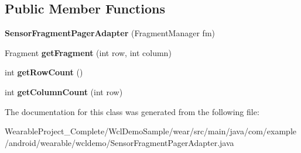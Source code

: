 \subsection*{Public Member Functions}
\begin{DoxyCompactItemize}
\item 
{\bfseries Sensor\+Fragment\+Pager\+Adapter} (Fragment\+Manager fm)\hypertarget{classcom_1_1example_1_1android_1_1wearable_1_1wcldemo_1_1SensorFragmentPagerAdapter_aa6cb1da97e551772bb3b2a8d407ede9e}{}\label{classcom_1_1example_1_1android_1_1wearable_1_1wcldemo_1_1SensorFragmentPagerAdapter_aa6cb1da97e551772bb3b2a8d407ede9e}

\item 
Fragment {\bfseries get\+Fragment} (int row, int column)\hypertarget{classcom_1_1example_1_1android_1_1wearable_1_1wcldemo_1_1SensorFragmentPagerAdapter_a5db05b7ff055acf94f80daa0dd1926a6}{}\label{classcom_1_1example_1_1android_1_1wearable_1_1wcldemo_1_1SensorFragmentPagerAdapter_a5db05b7ff055acf94f80daa0dd1926a6}

\item 
int {\bfseries get\+Row\+Count} ()\hypertarget{classcom_1_1example_1_1android_1_1wearable_1_1wcldemo_1_1SensorFragmentPagerAdapter_a899c57814dd9d2e07709694c737d0a83}{}\label{classcom_1_1example_1_1android_1_1wearable_1_1wcldemo_1_1SensorFragmentPagerAdapter_a899c57814dd9d2e07709694c737d0a83}

\item 
int {\bfseries get\+Column\+Count} (int row)\hypertarget{classcom_1_1example_1_1android_1_1wearable_1_1wcldemo_1_1SensorFragmentPagerAdapter_a067972b20e2a7cca94fb1e5bff112101}{}\label{classcom_1_1example_1_1android_1_1wearable_1_1wcldemo_1_1SensorFragmentPagerAdapter_a067972b20e2a7cca94fb1e5bff112101}

\end{DoxyCompactItemize}


The documentation for this class was generated from the following file\+:\begin{DoxyCompactItemize}
\item 
Wearable\+Project\+\_\+\+Complete/\+Wcl\+Demo\+Sample/wear/src/main/java/com/example/android/wearable/wcldemo/Sensor\+Fragment\+Pager\+Adapter.\+java\end{DoxyCompactItemize}

